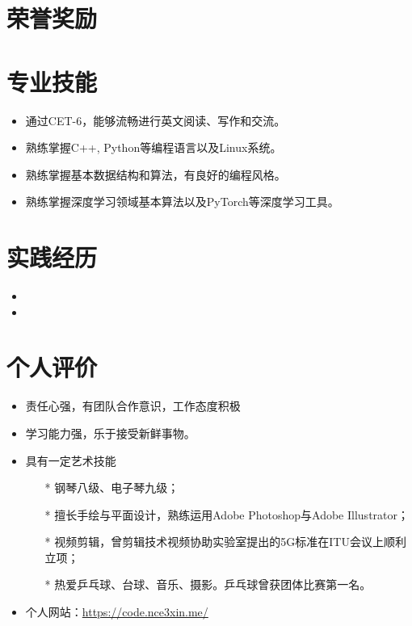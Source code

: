 \documentclass{resume}
\begin{document}
\section{荣誉奖励}



\section{专业技能}
\begin{itemize}[parsep=0.5ex]
  \item 通过CET-6，能够流畅进行英文阅读、写作和交流。
  \item 熟练掌握C++, Python等编程语言以及Linux系统。
  \item 熟练掌握基本数据结构和算法，有良好的编程风格。
  \item 熟练掌握深度学习领域基本算法以及PyTorch等深度学习工具。
\end{itemize}

\section{实践经历}
\begin{itemize}[parsep=0.5ex]
  \item {}
  \item {}
\end{itemize}

\section{个人评价}
\begin{itemize}[parsep=0.5ex]
  \item 责任心强，有团队合作意识，工作态度积极
  \item 学习能力强，乐于接受新鲜事物。
  \item 具有一定艺术技能
  \begin{itemize}[parsep=0.5ex]
    \item[*] 钢琴八级、电子琴九级；
    \item[*] 擅长手绘与平面设计，熟练运用Adobe Photoshop与Adobe Illustrator；
    \item[*] 视频剪辑，曾剪辑技术视频协助实验室提出的5G标准在ITU会议上顺利立项；
    \item[*] 热爱乒乓球、台球、音乐、摄影。乒乓球曾获团体比赛第一名。
  \end{itemize}
  \item 个人网站：\href{https://code.nce3xin.me/}{https://code.nce3xin.me/}
\end{itemize}

%
%
\end{document}

